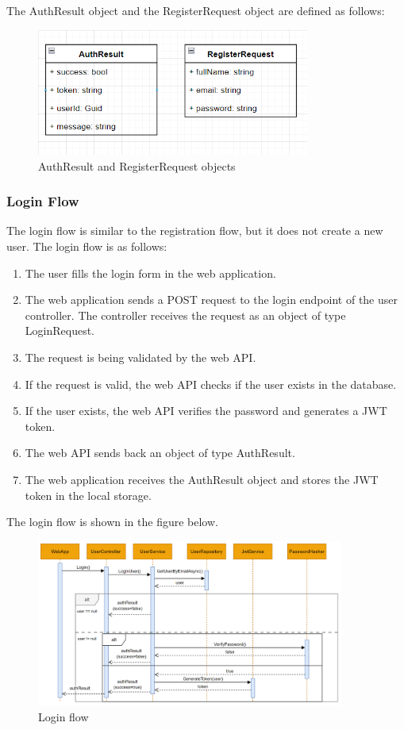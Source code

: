 The AuthResult object and the RegisterRequest object are defined as follows:
\begin{figure}[H]
    \centering
    \includegraphics[width=0.8\textwidth]{images/auth-request.png}
    \caption{AuthResult and RegisterRequest objects}
    \label{fig:auth-result}
\end{figure}

\subsubsection{Login Flow}
The login flow is similar to the registration flow, but it does not create a new user.
The login flow is as follows:
\begin{enumerate}
    \item The user fills the login form in the web application.
    \item The web application sends a POST request to the login endpoint of the user controller. The controller
    receives the request as an object of type LoginRequest.
    \item The request is being validated by the web API.
    \item If the request is valid, the web API checks if the user exists in the database.
    \item If the user exists, the web API verifies the password and generates a JWT token.
    \item The web API sends back an object of type AuthResult.
    \item The web application receives the AuthResult object and stores the JWT token in the local storage.
\end{enumerate}

The login flow is shown in the figure below.
\begin{figure}[H]
    \centering
    \includegraphics[width=0.9\textwidth]{images/login-flow.png}
    \caption{Login flow}
    \label{fig:login-flow}
\end{figure}


